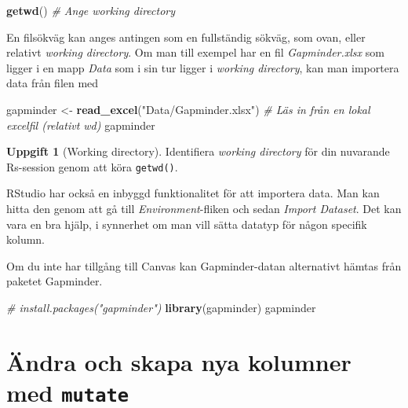 \documentclass[
]{book}
\newenvironment{Shaded}{\begin{snugshade}}{\end{snugshade}}
\newcommand{\CommentTok}[1]{\textcolor[rgb]{0.56,0.35,0.01}{\textit{#1}}}
\newcommand{\FunctionTok}[1]{\textcolor[rgb]{0.13,0.29,0.53}{\textbf{#1}}}
\newcommand{\NormalTok}[1]{#1}
\newcommand{\OtherTok}[1]{\textcolor[rgb]{0.56,0.35,0.01}{#1}}
\newcommand{\StringTok}[1]{\textcolor[rgb]{0.31,0.60,0.02}{#1}}
\theoremstyle{definition}
\theoremstyle{definition}
\theoremstyle{definition}
\newtheorem{exercise}{Uppgift}[chapter]
\theoremstyle{definition}
\theoremstyle{remark}
\begin{document}
\begin{Shaded}
\begin{Highlighting}[]
\FunctionTok{getwd}\NormalTok{() }\CommentTok{\# Ange working directory}
\end{Highlighting}
\end{Shaded}

En filsökväg kan anges antingen som en fullständig sökväg, som ovan, eller relativt \emph{working directory}. Om man till exempel har en fil \emph{Gapminder.xlsx} som ligger i en mapp \emph{Data} som i sin tur ligger i \emph{working directory}, kan man importera data från filen med

\begin{Shaded}
\begin{Highlighting}[]
\NormalTok{gapminder }\OtherTok{\textless{}{-}} \FunctionTok{read\_excel}\NormalTok{(}\StringTok{"Data/Gapminder.xlsx"}\NormalTok{)}
\CommentTok{\# Läs in från en lokal excelfil (relativt wd)}
\NormalTok{gapminder }
\end{Highlighting}
\end{Shaded}

\begin{exercise}[Working directory]
Identifiera \emph{working directory} för din nuvarande Rs-session genom att köra \texttt{getwd()}.
\end{exercise}

RStudio har också en inbyggd funktionalitet för att importera data. Man kan hitta den genom att gå till \emph{Environment}-fliken och sedan \emph{Import Dataset}. Det kan vara en bra hjälp, i synnerhet om man vill sätta datatyp för någon specifik kolumn.

Om du inte har tillgång till Canvas kan Gapminder-datan alternativt hämtas från paketet Gapminder.

\begin{Shaded}
\begin{Highlighting}[]
\CommentTok{\# install.packages("gapminder")}
\FunctionTok{library}\NormalTok{(gapminder)             }
\NormalTok{gapminder                      }
\end{Highlighting}
\end{Shaded}

\section{\texorpdfstring{Ändra och skapa nya kolumner med \texttt{mutate}}{Ändra och skapa nya kolumner med mutate}}\label{uxe4ndra-och-skapa-nya-kolumner-med-mutate}
\end{document}
